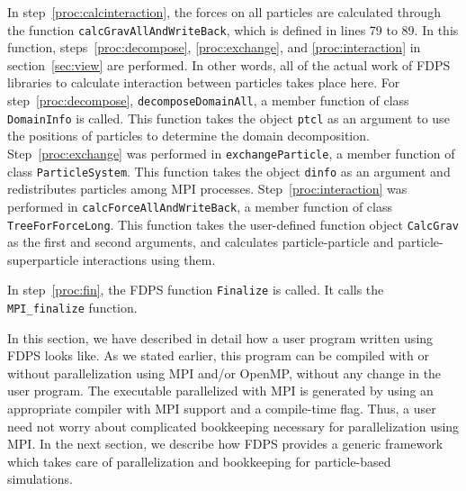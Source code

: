 In step~\ref{proc:calcinteraction}, the forces on all particles are
calculated through the function \texttt{calcGravAllAndWriteBack}, which
is defined in lines 79 to 89. In this function,
steps~\ref{proc:decompose}, \ref{proc:exchange}, and
\ref{proc:interaction} in section~\ref{sec:view} are performed. In
other words, all of the actual work of FDPS libraries to calculate
interaction between particles takes place here. For
step~\ref{proc:decompose}, \texttt{decomposeDomainAll}, a member function
of class \texttt{DomainInfo} is called. This function takes the object
\texttt{ptcl} as an argument to use the positions of particles to
determine the domain decomposition.  Step~\ref{proc:exchange} was
performed in \texttt{exchangeParticle}, a member function of
class \texttt{ParticleSystem}. This function takes the
object \texttt{dinfo} as an argument and redistributes particles among
MPI processes.  Step~\ref{proc:interaction} was performed
in \texttt{calcForceAllAndWriteBack}, a member function of
class \texttt{TreeForForceLong}. This function takes the user-defined
function object \texttt{CalcGrav} as the first and second arguments,
and calculates particle-particle and particle-superparticle
interactions using them.

In step~\ref{proc:fin}, the FDPS function \texttt{Finalize} is
called. It calls the \texttt{MPI\_finalize} function.

In this section, we have described in detail how a user program
written using FDPS looks like. As we stated earlier, this program can
be compiled with or without parallelization using MPI and/or OpenMP,
without any change in the user program. The executable parallelized
with MPI is generated by using an appropriate compiler with MPI
support and a compile-time flag.  Thus, a user need not worry about
complicated bookkeeping necessary for parallelization using MPI.
%
In the next section, we describe how FDPS provides a generic
framework which takes care of parallelization
and bookkeeping for particle-based simulations. 


